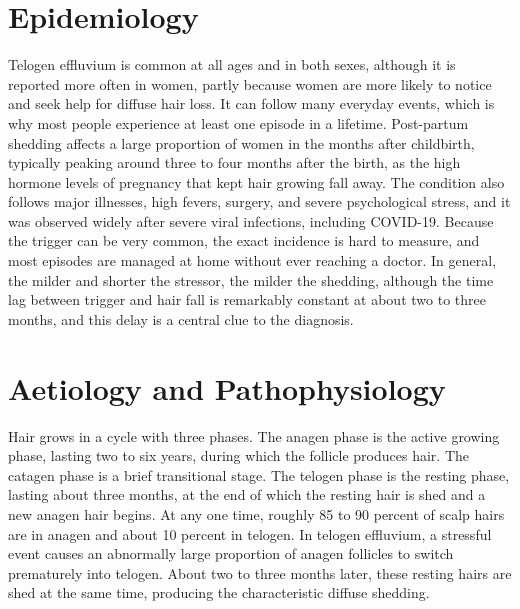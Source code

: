 \section*{Epidemiology}
Telogen effluvium is common at all ages and in both sexes, although it is reported more often in women, partly because women are more likely to notice and seek help for diffuse hair loss. It can follow many everyday events, which is why most people experience at least one episode in a lifetime. Post-partum shedding affects a large proportion of women in the months after childbirth, typically peaking around three to four months after the birth, as the high hormone levels of pregnancy that kept hair growing fall away. The condition also follows major illnesses, high fevers, surgery, and severe psychological stress, and it was observed widely after severe viral infections, including COVID-19. Because the trigger can be very common, the exact incidence is hard to measure, and most episodes are managed at home without ever reaching a doctor. In general, the milder and shorter the stressor, the milder the shedding, although the time lag between trigger and hair fall is remarkably constant at about two to three months, and this delay is a central clue to the diagnosis.

\section*{Aetiology and Pathophysiology}
Hair grows in a cycle with three phases. The anagen phase is the active growing phase, lasting two to six years, during which the follicle produces hair. The catagen phase is a brief transitional stage. The telogen phase is the resting phase, lasting about three months, at the end of which the resting hair is shed and a new anagen hair begins. At any one time, roughly 85 to 90 percent of scalp hairs are in anagen and about 10 percent in telogen. In telogen effluvium, a stressful event causes an abnormally large proportion of anagen follicles to switch prematurely into telogen. About two to three months later, these resting hairs are shed at the same time, producing the characteristic diffuse shedding.

